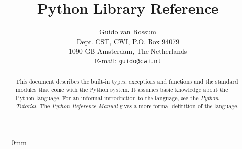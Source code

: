 %

\title{\bf
	Python Library Reference
}

\author{
	Guido van Rossum \\
	Dept. CST, CWI, P.O. Box 94079 \\
	1090 GB Amsterdam, The Netherlands \\
	E-mail: {\tt guido@cwi.nl}
}

\makeindex


{}

\maketitle

\begin{abstract}

\noindent
This document describes the built-in types, exceptions and functions
and the standard modules that come with the Python system.  It assumes
basic knowledge about the Python language.  For an informal
introduction to the language, see the {\em Python Tutorial}.  The {\em
Python Reference Manual} gives a more formal definition of the
language.

\end{abstract}

\pagebreak

{
\parskip = 0mm
\tableofcontents
}

\pagebreak




